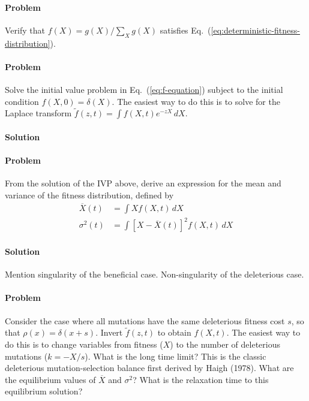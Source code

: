 \documentclass[11pt]{article}
\newcommand{\eq}[1]{Eq.~(\ref{#1})}
\begin{document}
\paragraph{Problem} Verify that $f(X) = g(X) / \sum_X g(X)$ satisfies \eq{eq:deterministic-fitness-distribution}. 

\paragraph{Problem} Solve the initial value problem in \eq{eq:f-equation} subject to the initial condition $f(X,0) = \delta(X)$. The easiest way to do this is to solve for the Laplace transform $\tilde{f}(z,t) = \int f(X,t) e^{-z X} \, dX$. 

\paragraph{Solution}

\paragraph{Problem} From the solution of the IVP above, derive an expression for the mean and variance of the fitness distribution, defined by
\begin{align}
\overline{X}(t) & = \int X f(X,t) \, dX \\
\sigma^2(t) & = \int \left[ X-\overline{X}(t) \right]^2  f(X,t) \, dX
\end{align}

\paragraph{Solution}

Mention singularity of the beneficial case. Non-singularity of the deleterious case. 

\paragraph{Problem} Consider the case where all mutations have the same deleterious fitness cost $s$, so that $\rho(x) = \delta(x+s)$. Invert $\tilde{f}(z,t)$ to obtain $f(X,t)$. The easiest way to do this is to change variables from fitness ($X$) to the number of deleterious mutations ($k = -X/s$). What is the long time limit? This is the classic deleterious mutation-selection balance first derived by Haigh (1978). What are the equilibrium values of $\overline{X}$ and $\sigma^2$? What is the relaxation time to this equilibrium solution? 
\end{document}
